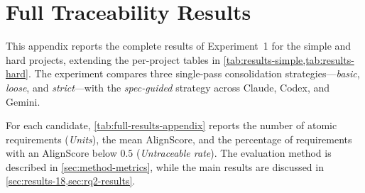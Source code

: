 \chapter{Full Traceability Results}
\label{app:results}

This appendix reports the complete results of Experiment~1 for the simple and
hard projects, extending the per-project tables in
\cref{tab:results-simple,tab:results-hard}. The experiment compares three
single-pass consolidation strategies---\emph{basic}, \emph{loose}, and
\emph{strict}---with the \emph{spec-guided} strategy across Claude, Codex,
and Gemini.

For each candidate, \cref{tab:full-results-appendix} reports the number of
atomic requirements (\emph{Units}), the mean AlignScore, and the percentage of
requirements with an AlignScore below $0.5$ (\emph{Untraceable rate}). The
evaluation method is described in \cref{sec:method-metrics}, while the main
results are discussed in \cref{sec:results-18,sec:rq2-results}.

